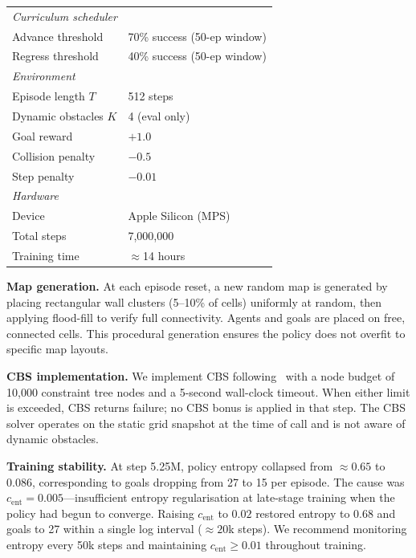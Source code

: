 \documentclass[letterpaper,twocolumn,10pt]{article}
\begin{document}
\begin{table}[t]
\begin{tabular}{ll}
\midrule
\multicolumn{2}{l}{\emph{Curriculum scheduler}} \\
Advance threshold        & 70\% success (50-ep window) \\
Regress threshold        & 40\% success (50-ep window) \\
\midrule
\multicolumn{2}{l}{\emph{Environment}} \\
Episode length $T$       & 512 steps \\
Dynamic obstacles $K$    & 4 (eval only) \\
Goal reward              & $+1.0$ \\
Collision penalty        & $-0.5$ \\
Step penalty             & $-0.01$ \\
\midrule
\multicolumn{2}{l}{\emph{Hardware}} \\
Device                   & Apple Silicon (MPS) \\
Total steps              & 7,000,000 \\
Training time            & $\approx$14 hours \\
\bottomrule
\end{tabular}
\end{table}

\textbf{Map generation.} At each episode reset, a new random map is generated by
placing rectangular wall clusters (5--10\% of cells) uniformly at random, then
applying flood-fill to verify full connectivity. Agents and goals are placed on
free, connected cells. This procedural generation ensures the policy does not
overfit to specific map layouts.

\textbf{CBS implementation.} We implement CBS following~\cite{sharon2015cbs} with
a node budget of 10,000 constraint tree nodes and a 5-second wall-clock timeout.
When either limit is exceeded, CBS returns failure; no CBS bonus is applied in that
step. The CBS solver operates on the static grid snapshot at the time of call and
is not aware of dynamic obstacles.

\textbf{Training stability.} At step 5.25M, policy entropy collapsed from $\approx
0.65$ to $0.086$, corresponding to goals dropping from 27 to 15 per episode. The
cause was $c_\text{ent} = 0.005$---insufficient entropy regularisation at late-stage
training when the policy had begun to converge. Raising $c_\text{ent}$ to $0.02$
restored entropy to $0.68$ and goals to 27 within a single log interval ($\approx 20$k
steps). We recommend monitoring entropy every 50k steps and maintaining
$c_\text{ent} \geq 0.01$ throughout training.
\end{document}
